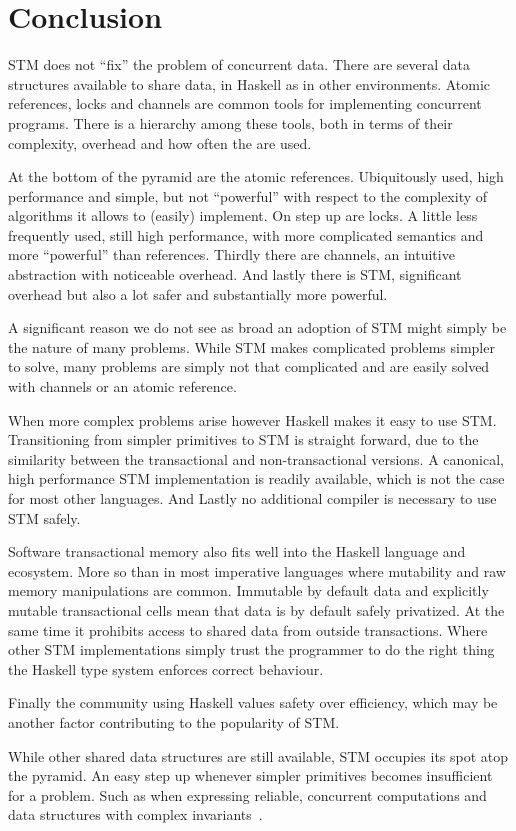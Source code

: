 \section{Conclusion}

\label{sec:conclusion}

STM does not ``fix'' the problem of concurrent data. There are several data
structures available to share data, in Haskell as in other environments. Atomic
references, locks and channels are common tools for implementing concurrent
programs. There is a hierarchy among these tools, both in terms of their
complexity, overhead and how often the are used.

At the bottom of the pyramid are the atomic references. Ubiquitously used, high
performance and simple, but not ``powerful'' with respect to the complexity of
algorithms it allows to (easily) implement. On step up are locks. A little less
frequently used, still high performance, with more complicated semantics and
more ``powerful'' than references. Thirdly there are channels, an intuitive
abstraction with noticeable overhead. And lastly there is STM, significant
overhead but also a lot safer and substantially more powerful.

A significant reason we do not see as broad an adoption of STM might simply be
the nature of many problems. While STM makes complicated problems simpler to
solve, many problems are simply not that complicated and are easily solved with
channels or an atomic reference.

When more complex problems arise however Haskell makes it easy to use STM.
Transitioning from simpler primitives to STM is straight forward, due to the
similarity between the transactional and non-transactional versions. A
canonical, high performance STM implementation is readily available, which is
not the case for most other languages. And Lastly no additional compiler is
necessary to use STM safely.

Software transactional memory also fits well into the Haskell language and
ecosystem. More so than in most imperative languages where mutability and raw
memory manipulations are common. Immutable by default data and explicitly
mutable transactional cells mean that data is by default safely privatized. At
the same time it prohibits access to shared data from outside transactions.
Where other STM implementations simply trust the programmer to do the right
thing the Haskell type system enforces correct behaviour.

Finally the community using Haskell values safety over efficiency, which may be
another factor contributing to the popularity of STM.

While other shared data structures are still available, STM occupies its spot
atop the pyramid. An easy step up whenever simpler primitives becomes
insufficient for a problem. Such as when expressing reliable, concurrent
computations and data structures with complex
invariants~\cite{lock-free-structures-haskell-stm}.
